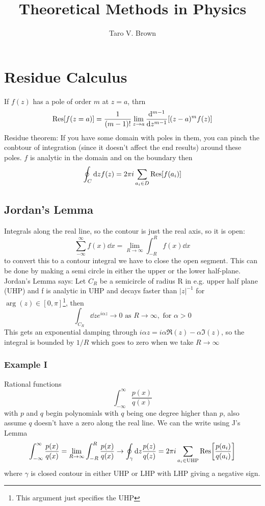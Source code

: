 \documentclass[a4paper,12pt]{article}
\title{Theoretical Methods in Physics}
\author[a]{Taro V. Brown}
\affiliation[a]{Department of Physics, UC Davis, One Shields Avenue, Davis, CA 95616, USA }
\begin{document}
 
\maketitle
\flushbottom
\tableofcontents
\newpage
\section{Residue Calculus}
If $f(z)$ has a pole of order $m$ at $z=a$, thrn
\begin{equation}
\Res[f(z=a)]=\frac{1}{(m-1)!}\lim_{z\to a}\dv[m-1]{}{z}[(z-a)^mf(z)]
\end{equation}
Residue theorem:
If you have some domain with poles in them, you can pinch the conbtour of integration (since it doesn't affect the end results) around these poles. $f$ is analytic in the domain and on the boundary then
\begin{equation}
\oint _C \dd z  f(z)=2\pi i \sum_{a_i\in D}\Res[f(a_i)]\end{equation}
\subsection{Jordan's Lemma} Integrals along the real line, so the contour is just the real axis, so it is open:
\begin{equation}
	\sum_{-\infty}^{\infty}f(x)\dd x= \lim_{R\to \infty }\int_{-R}^{R}f(x)\dd x
\end{equation}
to convert this to a contour integral we have to close the open segment. This can be done by making a semi circle in either the upper or the lower half-plane.
\\
Jordan's Lemma says:
Let $C_R$ be a semicircle of radius R in e.g. upper half plane (UHP) and f is analytic in UHP and decays faster than $|z|^{-1}$ for $\arg(z)\in [0,\pi]$\footnote{This argument just specifies the UHP}, then
\begin{equation}
	\int_{C_R} \dd z e^{i\alpha z}\to 0 \text{ as } R\to \infty, \text{ for } \alpha > 0
\end{equation}
This gets an exponential damping through $i\alpha z=i\alpha \Re (z)-\alpha \Im(z)$, so the integral is bounded by $1/R$ which goes to zero when we take $R\to \infty$\\
\subsubsection{Example I}
Rational functions
\begin{equation}
\int_{-\infty}^{\infty}\frac{p(x)}{q(x)}
\end{equation}
with $p$ and $q$ begin polynomials with $q$ being one degree higher than $p$, also assume $q$ doesn't have a zero along the real line. We can the write using J's Lemma
\begin{equation}
	\int_{-\infty}^{\infty}\frac{p(x)}{q(x)}=\lim_{R\to \infty}\int_{-R}^{R}\frac{p(x)}{q(x)}\to \oint_\gamma \dd z\frac{p(z)}{q(z)}=2\pi i \sum_{a_i\in\text{UHP}}\Res[\frac{p(a_i)}{q(a_i)}]
\end{equation}
where $\gamma$ is closed contour in either UHP or LHP with LHP giving a negative sign.\\
\end{document}
